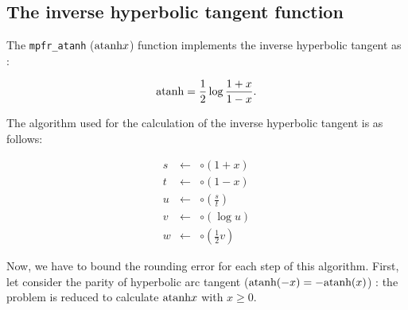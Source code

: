 \documentclass[12pt]{amsart}
\def\n{\textnormal}
\begin{document}
\subsection{The inverse hyperbolic tangent function}

The {\tt mpfr\_atanh} ($\n{atanh}{x}$) function implements the inverse
hyperbolic tangent as :

\[\n{atanh} = \frac{1}{2} \log \frac{1+x}{1-x}.\]

The algorithm used for the calculation of the inverse hyperbolic tangent is
as follows:

\begin{eqnarray}\nonumber
s&\leftarrow&\circ(1+x)\\\nonumber
t&\leftarrow&\circ(1-x)\\\nonumber
u&\leftarrow&\circ(\frac{s}{t})\\\nonumber
v&\leftarrow&\circ(\log u)\\\nonumber
w&\leftarrow&\circ(\frac{1}{2} v)
\end{eqnarray}


Now, we have to bound the rounding error for each step of this
algorithm. First, let consider the parity of hyperbolic arc tangent
($\n{atanh}(-x)=-\n{atanh}(x)$) : the problem is reduced to calculate
$\n{atanh} x$ with $x \geq 0$.
\end{document}
